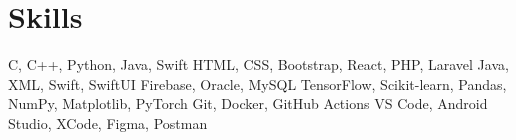 \section{\textbf{Skills}}

 \resumeHeadingSkillStart
    {C, C++, Python, Java, Swift}
    {HTML, CSS, Bootstrap, React, PHP, Laravel}
    {Java, XML, Swift, SwiftUI}
    {Firebase, Oracle, MySQL}
    {TensorFlow, Scikit-learn, Pandas, NumPy, Matplotlib, PyTorch}
    {Git, Docker, GitHub Actions}
    {VS Code, Android Studio, XCode, Figma, Postman}
 \resumeHeadingSkillEnd